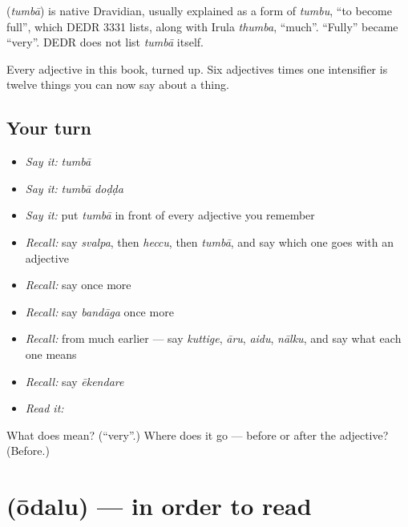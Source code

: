\begin{cousinweb}
\textbf{} (\emph{tumbā}) is native Dravidian, usually explained as a form of \emph{tumbu}, \textquotedblleft{}to become full\textquotedblright{}, which DEDR 3331 lists, along with Irula \emph{thumba}, \textquotedblleft{}much\textquotedblright{}. \textquotedblleft{}Fully\textquotedblright{} became \textquotedblleft{}very\textquotedblright{}. DEDR does not list \emph{tumbā} itself.
\end{cousinweb}

\begin{grammarlens}[title={What you've built}]
Every adjective in this book, turned up. Six adjectives times one intensifier is twelve things you can now say about a thing.
\end{grammarlens}

\subsection*{Your turn}
\begin{itemize}
\raggedright
  \item \emph{Say it:} \emph{tumbā}
  \item \emph{Say it:} \emph{tumbā doḍḍa}
  \item \emph{Say it:} put \emph{tumbā} in front of every adjective you remember
  \item \emph{Recall:} say \emph{svalpa}, then \emph{heccu}, then \emph{tumbā}, and say which one goes with an adjective
  \item \emph{Recall:} say \emph{} once more
  \item \emph{Recall:} say \emph{bandāga} once more
  \item \emph{Recall:} from much earlier — say \emph{kuttige}, \emph{āru}, \emph{aidu}, \emph{nālku}, and say what each one means
  \item \emph{Recall:} say \emph{ēkendare}
  \item \emph{Read it:} \textbf{}
\end{itemize}

\begin{tcolorbox}[breakable,colback=teal!4,colframe=teal!35!black,title={Before you move on}]
What does  mean? (\textquotedblleft{}very\textquotedblright{}.) Where does it go — before or after the adjective? (Before.)
\end{tcolorbox}
\section[\texorpdfstring{\kn{ಓದಲು} (ōdalu)}{ಓದಲು (ōdalu)}]{ (ōdalu) — in order to read}

